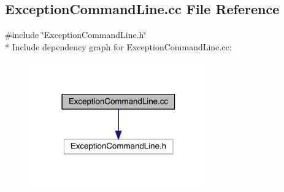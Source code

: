 \hypertarget{a00004}{}\subsection{Exception\+Command\+Line.\+cc File Reference}
\label{a00004}
{\ttfamily \#include \char`\"{}Exception\+Command\+Line.\+h\char`\"{}}\\*
Include dependency graph for Exception\+Command\+Line.\+cc\+:
\nopagebreak
\begin{figure}[H]
\begin{center}
\leavevmode
\includegraphics[width=218pt]{a00014}
\end{center}
\end{figure}
